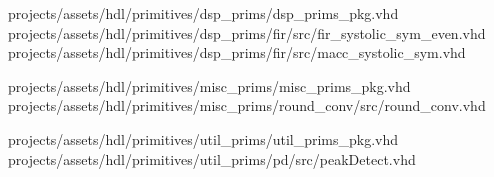 	\item projects/assets/hdl/primitives/dsp\_prims/dsp\_prims\_pkg.vhd
	      \subitem projects/assets/hdl/primitives/dsp\_prims/fir/src/fir\_systolic\_sym\_even.vhd
	      \subitem projects/assets/hdl/primitives/dsp\_prims/fir/src/macc\_systolic\_sym.vhd
	\item projects/assets/hdl/primitives/misc\_prims/misc\_prims\_pkg.vhd
	      \subitem projects/assets/hdl/primitives/misc\_prims/round\_conv/src/round\_conv.vhd
	\item projects/assets/hdl/primitives/util\_prims/util\_prims\_pkg.vhd
	      \subitem projects/assets/hdl/primitives/util\_prims/pd/src/peakDetect.vhd
